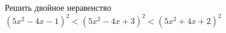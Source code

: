 \begin{ex}
	\begin{condition}
		Решить двойное неравенство $ (5x^2- 4x -1)^2<(5x^2- 4x + 3)^2<(5x^2 + 4x + 2)^2  $
	\end{condition}
\end{ex}